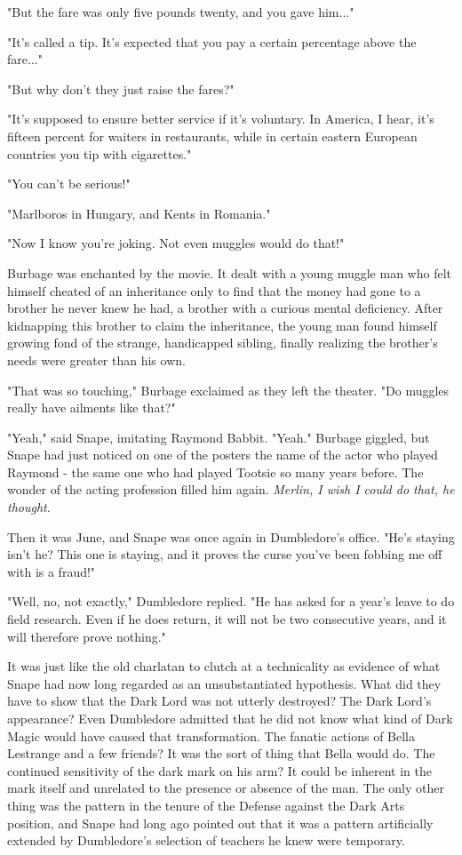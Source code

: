 "But the fare was only five pounds twenty, and you gave him..."

"It's called a tip. It's expected that you pay a certain percentage above the fare..."

"But why don't they just raise the fares?"

"It's supposed to ensure better service if it's voluntary. In America, I hear, it's fifteen percent for waiters in restaurants, while in certain eastern European countries you tip with cigarettes."

"You can't be serious!"

"Marlboros in Hungary, and Kents in Romania."

"Now I know you're joking. Not even muggles would do that!"

Burbage was enchanted by the movie. It dealt with a young muggle man who felt himself cheated of an inheritance only to find that the money had gone to a brother he never knew he had, a brother with a curious mental deficiency. After kidnapping this brother to claim the inheritance, the young man found himself growing fond of the strange, handicapped sibling, finally realizing the brother's needs were greater than his own.

"That was so touching," Burbage exclaimed as they left the theater. "Do muggles really have ailments like that?"

"Yeah," said Snape, imitating Raymond Babbit. "Yeah." Burbage giggled, but Snape had just noticed on one of the posters the name of the actor who played Raymond - the same one who had played Tootsie so many years before. The wonder of the acting profession filled him again. \emph{Merlin, I wish I could do that, he thought}.

Then it was June, and Snape was once again in Dumbledore's office. "He's staying isn't he? This one is staying, and it proves the curse you've been fobbing me off with is a fraud!"

"Well, no, not exactly," Dumbledore replied. "He has asked for a year's leave to do field research. Even if he does return, it will not be two consecutive years, and it will therefore prove nothing."

It was just like the old charlatan to clutch at a technicality as evidence of what Snape had now long regarded as an unsubstantiated hypothesis. What did they have to show that the Dark Lord was not utterly destroyed? The Dark Lord's appearance? Even Dumbledore admitted that he did not know what kind of Dark Magic would have caused that transformation. The fanatic actions of Bella Lestrange and a few friends? It was the sort of thing that Bella would do. The continued sensitivity of the dark mark on his arm? It could be inherent in the mark itself and unrelated to the presence or absence of the man. The only other thing was the pattern in the tenure of the Defense against the Dark Arts position, and Snape had long ago pointed out that it was a pattern artificially extended by Dumbledore's selection of teachers he knew were temporary.

